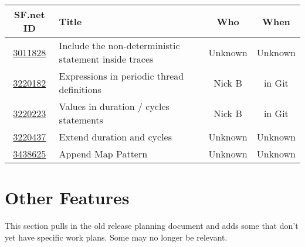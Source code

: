 \documentclass{overturerep}
\begin{document}
\begin{tabular}{clcc}
SF.net ID & Title & Who & When \\
\hline
\href{https://sourceforge.net/tracker/?func=detail&aid=3011828&group_id=141350&atid=1127184}{3011828}
	& Include the non-deterministic statement inside traces
	& Unknown & Unknown 
\\
\href{https://sourceforge.net/tracker/?func=detail&aid=3220182&group_id=141350&atid=1127184}{3220182}
	& Expressions in periodic thread definitions
	& Nick B & in Git
\\
\href{https://sourceforge.net/tracker/?func=detail&aid=3220223&group_id=141350&atid=1127184}{3220223}
	& Values in duration / cycles statements	
	& Nick B & in Git
\\
\href{https://sourceforge.net/tracker/?func=detail&aid=3220437&group_id=141350&atid=1127184}{3220437}
	& Extend duration and cycles	
	& Unknown & Unknown
\\
\href{https://sourceforge.net/tracker/?func=detail&aid=3438625&group_id=141350&atid=1127184}{3438625}
	& Append Map Pattern
	& Unknown & Unknown
\end{tabular}



\section{Other Features}
This section pulls in the old release planning document and adds some
that don't yet have specific work plans.  Some may no longer be
relevant.
\end{document}
